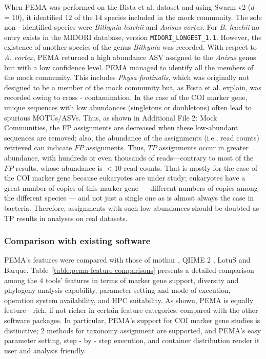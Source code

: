    When PEMA was performed on the Bista et al. dataset \citep{bista2018performance} and using Swarm v2 ($d$ = 10), it identified $12$ of the $14$ species included in the mock community. 
   The sole non - identified species were \textit{Bithynia leachii} and \textit{Anisus vortex}. For \textit{B. leachii} no entry exists in the MIDORI database, version \texttt{MIDORI\_LONGEST\_1.1}. 
   However, the existence of another species of the genus \textit{Bithynia} was recorded. 
   With respect to \textit{A. vortex}, PEMA returned a high abundance ASV assigned to the \textit{Anisus} genus but with a low confidence level. 
   PEMA managed to identify all the members of the mock community. 
   This includes \textit{Physa fontinalis}, which was originally not designed to be a member of the mock community but, as Bista et al. \citep{bista2018performance} explain, was recorded owing to cross - contamination. 
   In the case of the COI marker gene, unique sequences with low abundances (singletons or doubletons) often lead to spurious MOTUs/ASVs. 
   Thus, as shown in Additional File 2: Mock Communities, the FP assignments are decreased when these low-abundant sequences are removed; 
   also, the abundance of the assignments (i.e., read counts) retrieved can indicate $FP$ assignments. 
   Thus, $TP$ assignments occur in greater abundance, with hundreds or even thousands of reads—contrary to most of the $FP$ results, whose abundance is $<10$ read counts. 
   That is mostly for the case of the COI marker gene because eukaryotes are under study; 
   eukaryotes have a great number of copies of this marker gene — different numbers of copies among the different species — and not just a single one as is almost always the case in bacteria. 
   Therefore, assignments with such low abundances should be doubted as TP results in analyses on real datasets.



   \subsubsection*{Comparison with existing software}

   PEMA's features were compared with those of mothur \citep{schloss2009introducing}, QIIME 2 \citep{bolyen2018qiime}, LotuS \citep{hildebrand2014lotus} and Barque. 
   Table~\ref{table:pema-feature-comparisons} presents a detailed comparison among the $4$ tools' features in terms of marker gene support, diversity and phylogeny analysis capability, parameter setting and mode of execution, operation system availability, and HPC suitability. 
   As shown, PEMA is equally feature - rich, if not richer in certain feature categories, compared with the other software packages. In particular, PEMA's support for COI marker gene studies is distinctive; 
   $2$ methods for taxonomy assignment are supported, and PEMA's easy parameter setting, step - by - step execution, and container distribution render it user and analysis friendly.

